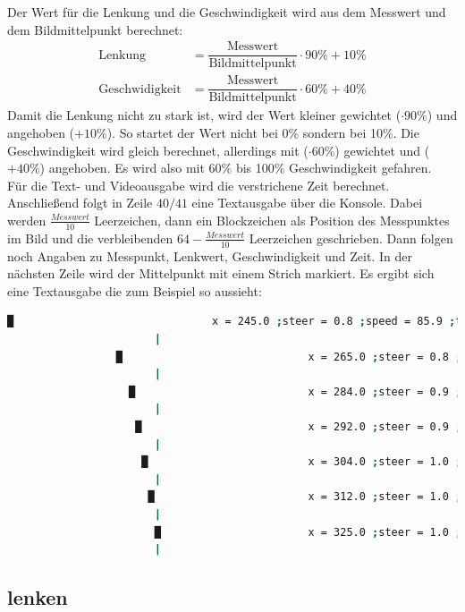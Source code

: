 \documentclass[a4paper, 12pt]{scrartcl}
\begin{document}
Der Wert für die Lenkung und die Geschwindigkeit wird aus dem Messwert und dem Bildmittelpunkt berechnet:
\begin{align}
	\text{Lenkung}&=\dfrac{\text{Messwert}}{\text{Bildmittelpunkt}}\cdot 90\% + 10\% \\
	\text{Geschwidigkeit}&=\dfrac{\text{Messwert}}{\text{Bildmittelpunkt}}\cdot 60\% + 40\%
\end{align}
Damit die Lenkung nicht zu stark ist, wird der Wert kleiner gewichtet ($\cdot 90\%$) und angehoben ($+10\%$). So startet der Wert nicht bei 0\% sondern bei 10\%.
Die Geschwindigkeit wird gleich berechnet, allerdings mit ($\cdot 60\%$) gewichtet und ($+40\%$) angehoben. Es wird also mit 60\% bis 100\% Geschwindigkeit gefahren.\\

Für die Text- und Videoausgabe wird die verstrichene Zeit berechnet.
Anschließend folgt in Zeile $40/41$ eine Textausgabe über die Konsole. Dabei werden $\frac{\textit{Messwert}}{10}$ Leerzeichen, dann ein Blockzeichen als Position des Messpunktes im Bild und die verbleibenden $64-\frac{\textit{Messwert}}{10}$ Leerzeichen geschrieben. Dann folgen noch Angaben zu Messpunkt, Lenkwert, Geschwindigkeit und Zeit. In der nächsten Zeile wird der Mittelpunkt mit einem Strich markiert. Es ergibt sich eine Textausgabe die zum Beispiel so aussieht:

\begin{lstlisting}[language=bash,basicstyle=\tiny,numbers=none]
               █                               x = 245.0 ;steer = 0.8 ;speed = 85.9 ;time = 00:00.00
                       |
                 █                             x = 265.0 ;steer = 0.8 ;speed = 89.7 ;time = 00:00.04
                       |
                   █                           x = 284.0 ;steer = 0.9 ;speed = 93.2 ;time = 00:00.08
                       |
                    █                          x = 292.0 ;steer = 0.9 ;speed = 94.8 ;time = 00:00.12
                       |
                     █                         x = 304.0 ;steer = 1.0 ;speed = 97.0 ;time = 00:00.16
                       |
                      █                        x = 312.0 ;steer = 1.0 ;speed = 98.5 ;time = 00:00.20
                       |
                       █                       x = 325.0 ;steer = 1.0 ;speed = 99.1 ;time = 00:00.24
                       |
\end{lstlisting}

\subsection{lenken}	%

\end{document}
